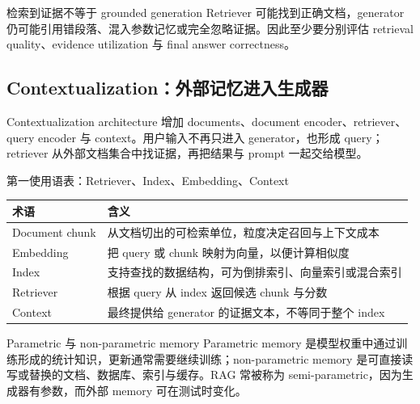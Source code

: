 \begin{warningbox}{检索到证据不等于 grounded generation}
Retriever 可能找到正确文档，generator 仍可能引用错段落、混入参数记忆或完全忽略证据。因此至少要分别评估 retrieval quality、evidence utilization 与 final answer correctness。
\end{warningbox}


\subsection{Contextualization：外部记忆进入生成器}

Contextualization architecture 增加 documents、document encoder、retriever、query encoder 与 context。用户输入不再只进入 generator，也形成 query；retriever 从外部文档集合中找证据，再把结果与 prompt 一起交给模型。


\begin{knowledgebox}{第一使用语表：Retriever、Index、Embedding、Context}
\begin{tabularx}{\textwidth}{L{0.17\textwidth}>{\raggedright\arraybackslash}X}
\toprule
术语 & 含义 \\
\midrule
Document chunk & 从文档切出的可检索单位，粒度决定召回与上下文成本 \\
Embedding & 把 query 或 chunk 映射为向量，以便计算相似度 \\
Index & 支持查找的数据结构，可为倒排索引、向量索引或混合索引 \\
Retriever & 根据 query 从 index 返回候选 chunk 与分数 \\
Context & 最终提供给 generator 的证据文本，不等同于整个 index \\
\bottomrule
\end{tabularx}
\end{knowledgebox}


\begin{importantbox}{Parametric 与 non-parametric memory}
Parametric memory 是模型权重中通过训练形成的统计知识，更新通常需要继续训练；non-parametric memory 是可直接读写或替换的文档、数据库、索引与缓存。RAG 常被称为 semi-parametric，因为生成器有参数，而外部 memory 可在测试时变化。
\end{importantbox}

